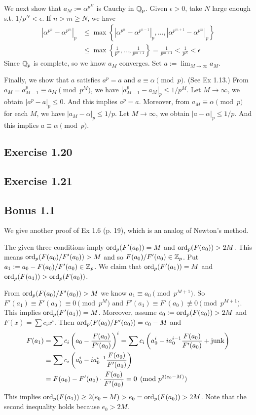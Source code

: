 \documentclass[../Koblitz.tex]{subfiles}
\begin{document}
We next show that $a_M:=\alpha^{p^M}$ is Cauchy in $\mathbb{Q}_p$. Given $\epsilon>0$, take $N$ large enough s.t. $1/p^N<\epsilon$. If $n>m\geq N$, we have
\begin{align*}
\left|\alpha^{p^n}-\alpha^{p^m}\right|_p &\leq \max\left\{ \left|\alpha^{p^n}-\alpha^{p^{n-1}}\right|_p,\ldots,\left|\alpha^{p^{m+1}}-\alpha^{p^m}\right|_p \right\} \\
&\leq \max \left\{ \frac{1}{p^n},\ldots,\frac{1}{p^{m+1}} \right\} = \frac{1}{p^{m+1}} < \frac{1}{p^N} <\epsilon
\end{align*}
Since $\mathbb{Q}_p$ is complete, so we know $a_M$ converges. Set $a:=\lim_{M\to\infty} a_M$.

Finally, we show that $a$ satisfies $a^p=a$ and $a\equiv\alpha\pmod{p}$. (See Ex 1.13.) From $a_M = a_{M-1}^p \equiv a_M \pmod{p^M}$, we have $|a_{M-1}^p-a_M|_p\leq 1/p^M$. Let $M\to\infty$, we obtain $|a^p-a|_p\leq 0$. And this implies $a^p=a$. Moreover, from $a_M\equiv\alpha\pmod{p}$ for each $M$, we have $|a_M-\alpha|_p\leq 1/p$. Let $M\to\infty$, we obtain $|a-\alpha|_p\leq 1/p$. And this implies $a\equiv\alpha\pmod{p}$.

\subsection*{Exercise 1.20}

\subsection*{Exercise 1.21}

\subsection*{Bonus 1.1} \label{Bonus 1.1}

We give another proof of Ex 1.6 (p. 19), which is an analog of Newton's method.

The given three conditions imply $\operatorname{ord}_p(F'(a_0))=M$ and $\operatorname{ord}_p(F(a_0))>2M$. This means $\operatorname{ord}_p(F(a_0)/F'(a_0))>M$ and so $F(a_0)/F'(a_0)\in\mathbb{Z}_p$. Put $a_1:=a_0-F(a_0)/F'(a_0)\in\mathbb{Z}_p$. We claim that $\operatorname{ord}_p(F'(a_1))=M$ and $\operatorname{ord}_p(F(a_1))>\operatorname{ord}_p(F(a_0))$.

From $\operatorname{ord}_p(F(a_0)/F'(a_0))>M$ we know $a_1\equiv a_0 \pmod{p^{M+1}}$. So $F'(a_1)\equiv F'(a_0)\equiv0\pmod{p^M}$ and $F'(a_1)\equiv F'(a_0)\not\equiv0\pmod{p^{M+1}}$. This implies $\operatorname{ord}_p(F'(a_1))=M$. Moreover, assume $e_0:=\operatorname{ord}_p(F(a_0))>2M$ and $F(x)=\sum c_ix^i$. Then $\operatorname{ord}_p(F(a_0)/F'(a_0))=e_0-M$ and
\begin{align*}
F(a_1) &= \sum c_i\left(a_0-\frac{F(a_0)}{F'(a_0)}\right)^i = \sum c_i\left(a_0^i - ia_0^{i-1}\frac{F(a_0)}{F'(a_0)}+\operatorname{junk}\right) \\
&\equiv \sum c_i\left(a_0^i - ia_0^{i-1}\frac{F(a_0)}{F'(a_0)}\right) \\
&= F(a_0) - F'(a_0)\cdot\frac{F(a_0)}{F'(a_0)} = 0 \pmod{p^{2(e_0-M)}}
\end{align*}
This implies $\operatorname{ord}_p(F(a_1)) \geq 2(e_0-M) > e_0 = \operatorname{ord}_p(F(a_0)) > 2M$. Note that the second inequality holds because $e_0>2M$.
\end{document}
